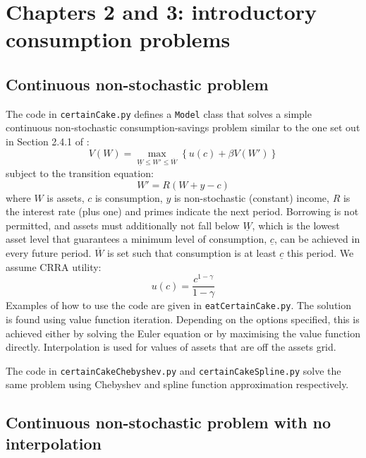 \section{Chapters 2 and 3: introductory consumption problems}

\subsection{Continuous non-stochastic problem}

The code in \texttt{certainCake.py} defines a \texttt{Model} class that solves a simple continuous non-stochastic consumption-savings problem similar to the one set out in Section 2.4.1 of \citet{adda2003dynamic}:
\begin{equation}
	V(W) = \max_{\underline{W} \leq W' \leq \overline{W}} \left\{ u(c) + \beta V(W') \right\}
\end{equation}
subject to the transition equation:
\begin{equation}
	W' = R (W + y - c)
\end{equation}
where \(W\) is assets, \(c\) is consumption, \(y\) is non-stochastic (constant) income, \(R\) is the interest rate (plus one) and primes indicate the next period. Borrowing is not permitted, and assets must additionally not fall below \(\underline{W}\), which is the lowest asset level that guarantees a minimum level of consumption, \(\underline{c}\), can be achieved in every future period. \(\overline{W}\) is set such that consumption is at least \(\underline{c}\) this period. We assume CRRA utility:
\begin{equation}
	u(c) = \frac{c^{1 - \gamma}}{1 - \gamma}
\end{equation}
Examples of how to use the code are given in \texttt{eatCertainCake.py}. The solution is found using value function iteration. Depending on the options specified, this is achieved either by solving the Euler equation or by maximising the value function directly. Interpolation is used for values of assets that are off the assets grid.

The code in \texttt{certainCakeChebyshev.py} and \texttt{certainCakeSpline.py} solve the same problem using Chebyshev and spline function approximation respectively.

\subsection{Continuous non-stochastic problem with no interpolation}

